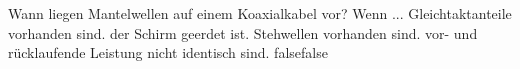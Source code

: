     {Wann liegen Mantelwellen auf einem Koaxialkabel vor? Wenn ...}
    {Gleichtaktanteile vorhanden sind.}
    {der Schirm geerdet ist.}
    {Stehwellen vorhanden sind.}
    {vor- und rücklaufende Leistung nicht identisch sind.}
    {false}{false}